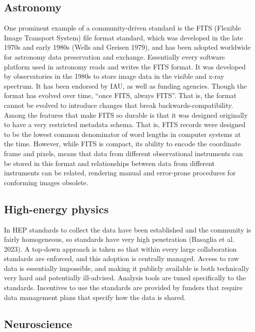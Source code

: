 \documentclass[
  letterpaper,
  DIV=11,
  numbers=noendperiod]{scrartcl}
\begin{document}
\subsection{Astronomy}\label{astronomy}

One prominent example of a community-driven standard is the FITS
(Flexible Image Transport System) file format standard, which was
developed in the late 1970s and early 1980s (Wells and Greisen 1979),
and has been adopted worldwide for astronomy data preservation and
exchange. Essentially every software platform used in astronomy reads
and writes the FITS format. It was developed by observatories in the
1980s to store image data in the visible and x-ray spectrum. It has been
endorsed by IAU, as well as funding agencies. Though the format has
evolved over time, ``once FITS, always FITS''. That is, the format
cannot be evolved to introduce changes that break
backwards-compatibility. Among the features that make FITS so durable is
that it was designed originally to have a very restricted metadata
schema. That is, FITS records were designed to be the lowest common
denominator of word lengths in computer systems at the time. However,
while FITS is compact, its ability to encode the coordinate frame and
pixels, means that data from different observational instruments can be
stored in this format and relationships between data from different
instruments can be related, rendering manual and error-prone procedures
for conforming images obsolete.

\subsection{High-energy physics}\label{high-energy-physics}

In HEP standards to collect the data have been established and the
community is fairly homogeneous, so standards have very high penetration
(Basaglia et al. 2023). A top-down approach is taken so that within
every large collaboration standards are enforced, and this adoption is
centrally managed. Access to raw data is essentially impossible, and
making it publicly available is both technically very hard and
potentially ill-advised. Analysis tools are tuned specifically to the
standards. Incentives to use the standards are provided by funders that
require data management plans that specify how the data is shared.

\subsection{Neuroscience}\label{neuroscience}
\end{document}
